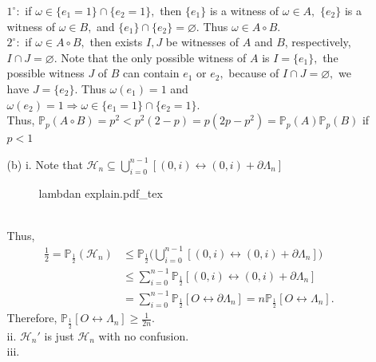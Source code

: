 \documentclass[12pt,a4paper]{report}
\theoremstyle{definition}
\newcommand{\incfig}[1]{%
{#1.pdf_tex}
}
\begin{document}
\begin{enumerate}
\begin{enumerate}
\[        \]
        $1^{\circ}:$ if $\omega\in \{e_1=1\}\cap \{e_2=1\},$ then $\{e_1\}$ is a witness of $\omega \in A,$ $\{e_2\}$ is a witness of $\omega\in B,$ and $\{e_1\}\cap\{e_2\}=\varnothing.$ Thus $\omega\in A\circ B.$\\[5pt]
        $2^{\circ}:$ if $\omega\in A\circ B,$ then exists $I,J$ be witnesses of $A$ and $B$, respectively, $I\cap J=\varnothing.$ Note that the only possible witness of $A$ is $I=\{e_1\},$ the possible witness $J$ of $B$ can contain $e_1$ or $e_2,$ because of $I\cap J=\varnothing,$ we have $J=\{e_2\}.$ Thus $\omega(e_1)=1$ and $\omega(e_2)=1\Rightarrow \omega\in \{e_1=1\}\cap\{e_2=1\}.$\\[7pt]
        Thus, $\mathbb{P}_p(A\circ B)=p^2<p^2(2-p)=p(2p-p^2)=\mathbb{P}_p(A)\mathbb{P}_{p}(B)$ if $p<1$
        \item[(b)] i. Note that $\mathcal{H}_{n}\subseteq \bigcup_{i=0}^{n-1}[(0,i)\leftrightarrow (0,i)+\partial\Lambda_n]$
    	\begin{figure}[htp]
    	\centering
        \def\svgwidth{8cm}
        \incfig{lambdan explain}
        \end{figure}\\
        Thus,
        \newpage
        \begin{align*}
        \frac{1}{2}=\mathbb{P}_\frac{1}{2}(\mathcal{H}_{n})&\leq \mathbb{P}_\frac{1}{2}\Big(\bigcup_{i=0}^{n-1}[(0,i)\leftrightarrow (0,i)+\partial\Lambda_n]\Big)\\
        &\leq\sum_{i=0}^{n-1}\mathbb{P}_\frac{1}{2}[(0,i)\leftrightarrow (0,i)+\partial\Lambda_n]\\
        &=\sum_{i=0}^{n-1}\mathbb{P}_\frac{1}{2}[O\leftrightarrow\partial\Lambda_n]=n\mathbb{P}_\frac{1}{2}[O\leftrightarrow\Lambda_n].
        \end{align*}
        Therefore, $\mathbb{P}_\frac{1}{2}[O\leftrightarrow\Lambda_n]\geq \frac{1}{2n}.$\\[7pt]
        ii. $\mathcal{H}_n'$ is just $\mathcal{H}_n$ with no confusion.\\[7pt]
        iii. 
    \end{enumerate}
\end{enumerate}
\newpage
\end{document}
